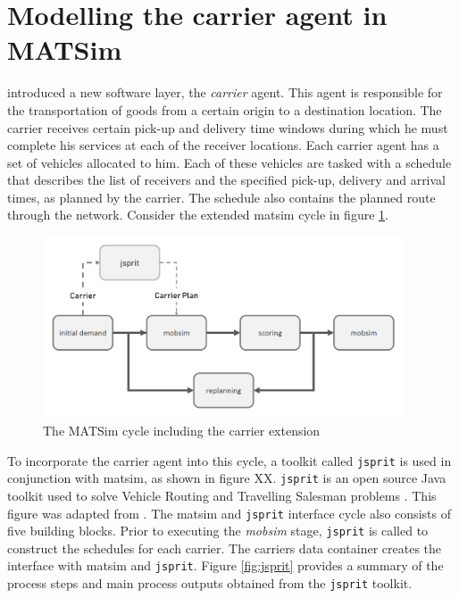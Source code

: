 \section{Modelling the carrier agent in MATSim}
\citet{schroeder2012towards} introduced a new software layer, the \textit{carrier} agent. This agent is responsible for the transportation of goods from a certain origin to a destination location. The carrier receives certain pick-up and delivery time windows during which he must complete his services at each of the receiver locations. Each carrier agent has a set of vehicles allocated to him. Each of these vehicles are tasked with a schedule that describes the list of receivers and the specified pick-up, delivery and arrival times, as planned by the carrier. The schedule also contains the planned route through the network.
Consider the extended \acrshort{matsim} cycle in figure \ref{fig:carrier_ext}. 

\begin{figure}[h]
    \centering
    \includegraphics[width=0.95\textwidth]{images/carrier_extension.PNG}
    \caption{The MATSim cycle including the carrier extension }
    \label{fig:carrier_ext}
\end{figure}


To incorporate the carrier agent into this cycle, a toolkit called \texttt{jsprit} is used in conjunction with \acrshort{matsim}, as shown in figure XX. \texttt{jsprit} is an open source Java toolkit used to solve Vehicle Routing and Travelling Salesman problems \citep{jsprit}.  This figure was adapted from \citet{bean2020behavioural}. The \acrshort{matsim} and \texttt{jsprit} interface cycle also consists of five building blocks. Prior to executing the \textit{mobsim} stage, \texttt{jsprit} is called to construct the schedules for each carrier.  The carriers data container creates the interface with \acrshort{matsim} and \texttt{jsprit}. Figure \ref{fig:jsprit} provides a summary of the process steps and main process outputs obtained from the \texttt{jsprit} toolkit.\\

